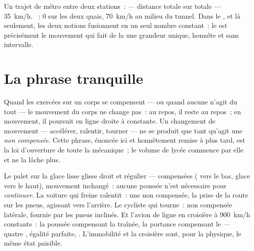 \begin{example}\label{ex:g9:uniform-varied-motion:sidebyside}
Un trajet de métro entre deux stations~:  --- distance
totale sur  totale --- \qty{35}{km/h}. ~: $0$
sur les deux quais, \qty{70}{km/h} au milieu du tunnel. Dans le
, et là seulement, les deux notions fusionnent en un
seul nombre constant~: le  est précisément le
mouvement qui fait de la  une grandeur unique, honnête et sans
intervalle.
\end{example}

\section{La phrase tranquille}

\begin{proposition}\label{prop:g9:uniform-varied-motion:inertia}
Quand les  exercées sur un corps se compensent --- ou quand
aucune n'agit du tout --- le mouvement du corps ne change pas~: au
repos, il reste au repos~; en mouvement, il poursuit en ligne droite à
 constante. Un changement de mouvement --- accélérer, ralentir,
tourner --- ne se produit que tant qu'agit une  \emph{non
compensée}. Cette phrase, énoncée ici et honnêtement remise à plus
tard, est la loi d'ouverture de toute la mécanique~; le volume de
lycée commence par elle et ne la lâche plus.
\end{proposition}

\begin{example}\label{ex:g9:uniform-varied-motion:reading}
Le palet sur la glace lisse glisse droit et régulier --- 
compensées ( vers le bas, glace vers le haut), mouvement
inchangé~: aucune poussée n'est nécessaire pour \emph{continuer}. La
voiture qui freine ralentit~: une  non compensée, la prise de la
route sur les pneus, agissant vers l'arrière. Le cycliste qui tourne~:
 non compensée latérale, fournie par les pneus inclinés. Et
l'avion de ligne en croisière à \qty{900}{km/h} constants~: la poussée
compensant la traînée, la portance compensant le  --- quatre
, égalité parfaite, . L'immobilité et la
croisière sont, pour la physique, le même état paisible.
\end{example}

